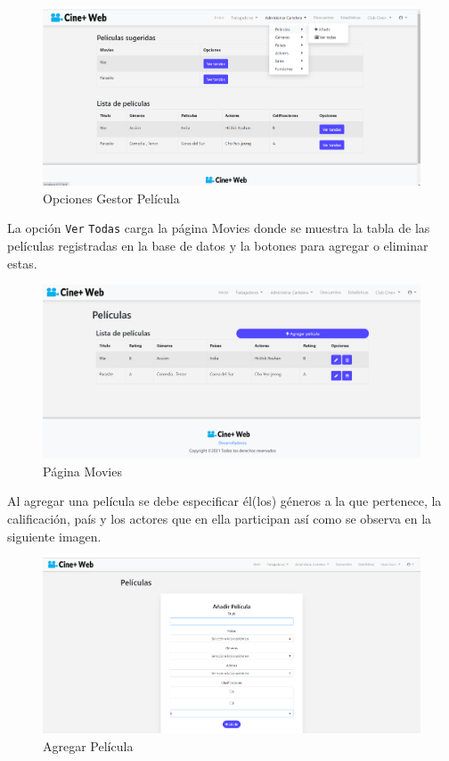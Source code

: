 \newpage
\begin{figure}[h!]
	\centering
	\includegraphics[scale=0.35]{./chapters/img/movie_option.png}
	
	\label{fig:movie_option}
	\caption{Opciones Gestor Pel\'icula}
	
\end{figure}
La opci\'on \verb*|Ver| \verb*|Todas| carga la p\'agina Movies donde se muestra la tabla de las pel\'iculas registradas en la base de datos y la botones para agregar o eliminar estas.

\begin{figure}[h!]
	\centering
	\includegraphics[scale=0.35]{./chapters/img/movies_table.png}
	
	\label{fig:movie_table}
	\caption{P\'agina Movies}
	
\end{figure}

Al agregar una pel\'icula se debe especificar \'el(los) g\'eneros a la que pertenece, la calificaci\'on, pa\'is y los actores que en ella participan as\'i como se observa en la siguiente imagen.
\newpage
\begin{figure}[h!]
	\centering
	\includegraphics[scale=0.35]{./chapters/img/add_movie.png}
	
	\label{fig:add_movie}
	\caption{Agregar Pel\'icula}
	
\end{figure}

